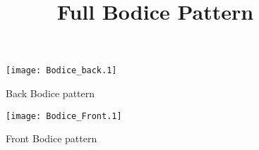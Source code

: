 \documentclass[12pt,landscape]{article}
\begin{document}
\date{}
\title {Full Bodice Pattern}
\maketitle

\begin{figure}[!ht]

\texttt{[image: Bodice\_back.1]}
\caption{Back Bodice pattern}

\end{figure}

\begin{figure}[!ht]

\texttt{[image: Bodice\_Front.1]}
\caption{Front Bodice pattern}

\end{figure}
\end{document}
